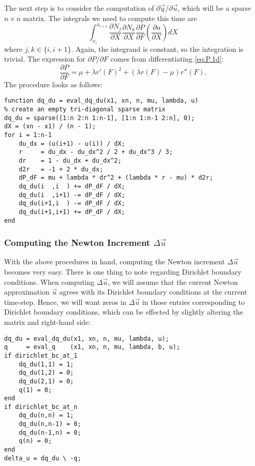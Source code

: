 The next step is to consider the computation of $\partial\vec{q}/\partial\vec{u}$, which will be a sparse $n \times n$ matrix. The integrals we need to compute this time are
\begin{equation*}
\int_{x_i}^{x_{i+1}} \frac{\partial N_j}{\partial X} \frac{\partial N_k}{\partial X} \frac{\partial P}{\partial F} \left( \frac{\partial u}{\partial X} \right) dX
\end{equation*}
where $j,k \in \{i, i+1\}$. Again, the integrand is constant, so the integration is trivial. The expression for $\partial P/\partial F$ comes from differentiating \eqref{eq:P.1d}:
\begin{equation*}
\frac{\partial P}{\partial F} = \mu + \lambda r'(F)^2 + \left( \lambda r(F) - \mu \right) r''(F).
\end{equation*}
The procedure looks as follows:
\begin{verbatim}
function dq_du = eval_dq_du(x1, xn, n, mu, lambda, u)
% create an empty tri-diagonal sparse matrix
dq_du = sparse([1:n 2:n 1:n-1], [1:n 1:n-1 2:n], 0);
dX = (xn - x1) / (n - 1);
for i = 1:n-1
    du_dx = (u(i+1) - u(i)) / dX;
    r     = du_dx - du_dx^2 / 2 + du_dx^3 / 3;
    dr    = 1 - du_dx + du_dx^2;
    d2r   = -1 + 2 * du_dx;
    dP_dF = mu + lambda * dr^2 + (lambda * r - mu) * d2r;
    dq_du(i  ,i  ) += dP_dF / dX;
    dq_du(i  ,i+1) -= dP_dF / dX;
    dq_du(i+1,i  ) -= dP_dF / dX;
    dq_du(i+1,i+1) += dP_dF / dX;
end
\end{verbatim}

\vspace{.5\baselineskip}
\subsubsection{Computing the Newton Increment $\Delta \vec{u}$}

With the above procedures in hand, computing the Newton increment $\Delta \vec{u}$ becomes very easy. There is one thing to note regarding Dirichlet boundary conditions. When computing $\Delta \vec{u}$, we will assume that the current Newton approximation $\vec{u}$ agrees with its Dirichlet boundary conditions at the current time-step. Hence, we will want zeros in $\Delta \vec{u}$ in those entries corresponding to Dirichlet boundary conditions, which can be effected by slightly altering the matrix and right-hand side:
\begin{verbatim}
dq_du = eval_dq_du(x1, xn, n, mu, lambda, u);
q     = eval_q    (x1, xn, n, mu, lambda, b, u);
if dirichlet_bc_at_1
    dq_du(1,1) = 1;
    dq_du(1,2) = 0;
    dq_du(2,1) = 0;
    q(1) = 0;
end
if dirichlet_bc_at_n
    dq_du(n,n) = 1;
    dq_du(n,n-1) = 0;
    dq_du(n-1,n) = 0;
    q(n) = 0;
end
delta_u = dq_du \ -q;
\end{verbatim}

